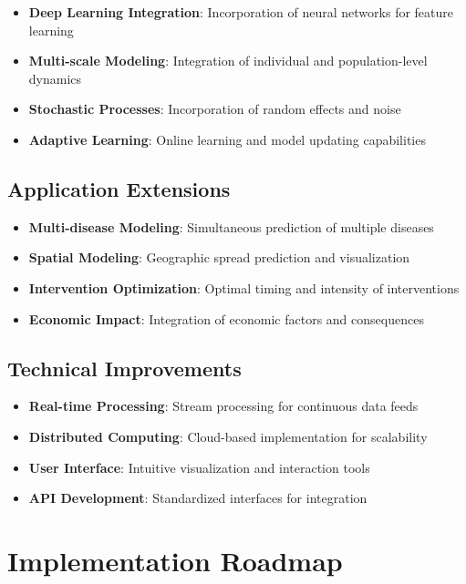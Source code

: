 \documentclass[12pt,a4paper]{report}
\begin{document}
\begin{itemize}
    \item \textbf{Deep Learning Integration}: Incorporation of neural networks for feature learning
    \item \textbf{Multi-scale Modeling}: Integration of individual and population-level dynamics
    \item \textbf{Stochastic Processes}: Incorporation of random effects and noise
    \item \textbf{Adaptive Learning}: Online learning and model updating capabilities
\end{itemize}

\subsection{Application Extensions}

\begin{itemize}
    \item \textbf{Multi-disease Modeling}: Simultaneous prediction of multiple diseases
    \item \textbf{Spatial Modeling}: Geographic spread prediction and visualization
    \item \textbf{Intervention Optimization}: Optimal timing and intensity of interventions
    \item \textbf{Economic Impact}: Integration of economic factors and consequences
\end{itemize}

\subsection{Technical Improvements}

\begin{itemize}
    \item \textbf{Real-time Processing}: Stream processing for continuous data feeds
    \item \textbf{Distributed Computing}: Cloud-based implementation for scalability
    \item \textbf{User Interface}: Intuitive visualization and interaction tools
    \item \textbf{API Development}: Standardized interfaces for integration
\end{itemize}

\section{Implementation Roadmap}
\end{document}
